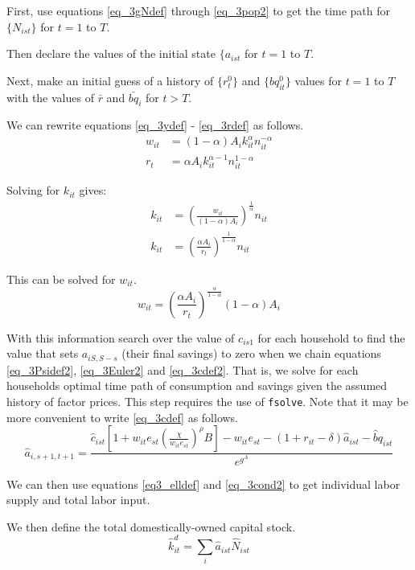 \documentclass[letterpaper,12pt]{article}
\theoremstyle{definition}
\numberwithin{equation}{section}
\begin{document}
\begin{spacing}{1.5}
	First, use equations \eqref{eq_3gNdef} through \eqref{eq_3pop2} to get the time path for $\{N_{ist}\}$ for $t=1$ to $T$.

	Then declare the values of the initial state $\{a_{ist}$ for $t=1$ to $T$.

	Next, make an initial guess of a history of $\{r^0_t\}$ and $\{bq^0_{it}\}$ values for $t=1$ to $T$ with the values of $\bar r$ and $\bar {bq}_i$ for $t>T$.

	We can rewrite equations \eqref{eq_3ydef} - \eqref{eq_3rdef} as follows.
	\begin{align}
		w_{it} & = (1-\alpha) A_i k_{it}^\alpha n_{it}^{-\alpha} \nonumber \\
		r_{t} & = \alpha A_i k_{it}^{\alpha-1} n_{it}^{1-\alpha} \nonumber
	\end{align}

	Solving for $k_{it}$ gives:
	\begin{align}
		k_{it} & = \left(\frac{w_{it}}{(1-\alpha)A_i} \right)^{\frac{1}{\alpha}} n_{it} \nonumber \\
		k_{it} & = \left(\frac{\alpha A_i}{r_t} \right)^{\frac{1}{1-\alpha}} n_{it} \nonumber
	\end{align}

	This can be solved for $w_{it}$.
	\begin{equation}
		w_{it} = \left(\frac{\alpha A_i}{r_t} \right)^{\frac{\alpha}{1-\alpha}} (1-\alpha) A_i \label{eq_3wfunc}
	\end{equation}

	With this information search over the value of $c_{is1}$ for each household to find the value that sets $a_{iS,S-s}$ (their final savings) to zero when we chain equations \eqref{eq_3Psidef2}, \eqref{eq_3Euler2} and \eqref{eq_3cdef2}.  That is, we solve for each households optimal time path of consumption and savings given the assumed history of factor prices.  This step requires the use of \texttt{fsolve}.  Note that it may be more convenient to write \eqref{eq_3cdef} as follows.
	\begin{equation}
		\hat a_{i,s+1,t+1} = \frac{\hat c_{ist} \left[ 1 + w_{it} e_{st} \left(\frac{\chi} {w_{it} e_{st}}\right)^{\rho}B \right] - w_{it} e_{st} - (1+r_{it}-\delta)\hat a_{ist} - {\hat bq}_{ist}}{e^{g^A}}
	\end{equation}

	We can then use equations \eqref{eq3_elldef} and \eqref{eq_3cond2} to get individual labor supply and total labor input.

	We then define the total domestically-owned capital stock.
	\begin{equation}
		\hat k^d_{it} = \sum_i \hat a_{ist} \hat N_{ist} \label{eq_3kddef}
	\end{equation}


\end{spacing}
\end{document}
